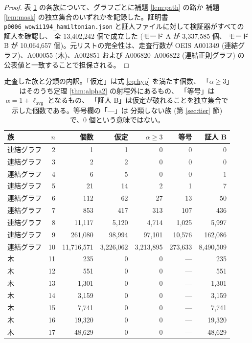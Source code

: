 \documentclass[paper=a4,fontsize=10.5pt,jafontsize=10.5pt]{jlreq}
\theoremstyle{plain}
\theoremstyle{definition}
\begin{document}
\begin{proof}
表 \ref{tab:fams} の各族について、グラフごとに補題 \ref{lem:path} の路か
補題 \ref{lem:mask} の独立集合のいずれかを記録した。証明書
\texttt{p0006\_wowii194\_hamiltonian.json} と証人ファイルに対して検証器がすべての証人を確認し、
全 13,402,242 個で成立した (モード A が 3,337,585 個、
モード B が 10,064,657 個)。元リストの完全性は、走査行数が OEIS A001349
(連結グラフ)、A000055 (木)、A002851 および A006820--A006822 (連結正則グラフ)
の公表値と一致することで担保される。
\end{proof}

\begin{table}[htbp]
\centering
\caption{走査した族と分類の内訳。「仮定」は式 \eqref{eq:hyp} を満たす個数、
「$\alpha \ge 3$」はそのうち定理 \ref{thm:alpha2} の射程外にあるもの、
「等号」は $\alpha = 1 + \ell_{\mathrm{avg}}$ となるもの、
「証人 B」は仮定が破れることを独立集合で示した個数である。等号欄の「---」は
分類しない族 (第 \ref{sec:tier} 節) で、0 個という意味ではない。}
\label{tab:fams}
\begin{tabular}{lrrrrrr}
\toprule
族 & $n$ & 個数 & 仮定 & $\alpha \ge 3$ & 等号 & 証人 B \\
\midrule
連結グラフ & 2 & 1 & 1 & 0 & 0 & 0 \\
連結グラフ & 3 & 2 & 2 & 0 & 0 & 0 \\
連結グラフ & 4 & 6 & 5 & 0 & 0 & 1 \\
連結グラフ & 5 & 21 & 14 & 2 & 1 & 7 \\
連結グラフ & 6 & 112 & 62 & 27 & 13 & 50 \\
連結グラフ & 7 & 853 & 417 & 313 & 107 & 436 \\
連結グラフ & 8 & 11,117 & 5,120 & 4,714 & 1,025 & 5,997 \\
連結グラフ & 9 & 261,080 & 98,994 & 97,101 & 10,576 & 162,086 \\
連結グラフ & 10 & 11,716,571 & 3,226,062 & 3,213,895 & 273,633 & 8,490,509 \\
木 & 11 & 235 & 0 & 0 & --- & 235 \\
木 & 12 & 551 & 0 & 0 & --- & 551 \\
木 & 13 & 1,301 & 0 & 0 & --- & 1,301 \\
木 & 14 & 3,159 & 0 & 0 & --- & 3,159 \\
木 & 15 & 7,741 & 0 & 0 & --- & 7,741 \\
木 & 16 & 19,320 & 0 & 0 & --- & 19,320 \\
木 & 17 & 48,629 & 0 & 0 & --- & 48,629 \\

\end{tabular}
\end{table}
\end{document}
